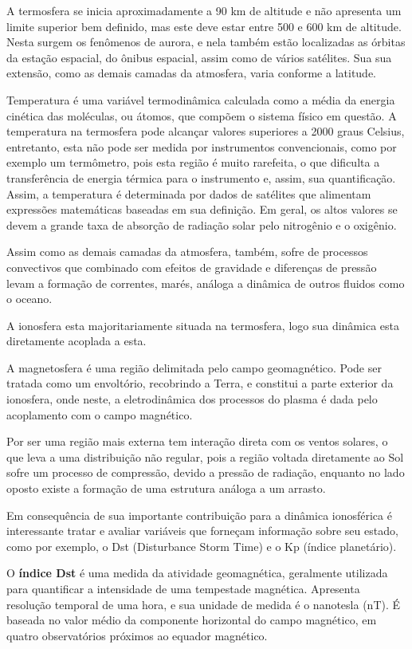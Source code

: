 A termosfera se inicia aproximadamente a 90 km de altitude e não apresenta um limite superior bem definido, mas este deve estar entre 500 e 600 km de altitude. Nesta surgem os fenômenos de aurora, e nela também estão localizadas as órbitas da estação espacial, do ônibus espacial, assim como de vários satélites. Sua sua extensão, como as demais camadas da atmosfera, varia conforme a latitude. 

Temperatura é uma variável termodinâmica calculada como a média da energia cinética das moléculas, ou átomos, que compõem o sistema físico em questão. A temperatura na termosfera pode alcançar valores superiores a 2000 graus Celsius, entretanto, esta não pode ser medida por instrumentos convencionais, como por exemplo um termômetro, pois esta região é muito rarefeita, o que dificulta a transferência de energia térmica para o instrumento e, assim, sua quantificação. Assim, a temperatura é determinada por dados de satélites que alimentam expressões matemáticas baseadas em sua definição. Em geral, os altos valores se devem a grande taxa de absorção de radiação solar pelo nitrogênio e o oxigênio.

Assim como as demais camadas da atmosfera, também, sofre de processos convectivos que combinado com efeitos de gravidade e diferenças de pressão levam a formação de correntes, marés, análoga a dinâmica de outros fluidos como o oceano.

A ionosfera esta majoritariamente situada na termosfera, logo sua dinâmica esta diretamente acoplada a esta.

A magnetosfera é uma região delimitada pelo campo geomagnético. Pode ser tratada como um envoltório, recobrindo a Terra, e constitui a parte exterior da ionosfera, onde neste, a eletrodinâmica dos processos do plasma é dada pelo acoplamento com o campo magnético.

Por ser uma região mais externa tem interação direta com os ventos solares, o que leva  a uma distribuição não regular, pois a região voltada diretamente ao Sol sofre um processo de compressão, devido a pressão de radiação, enquanto no lado oposto existe a formação de uma estrutura análoga a um arrasto.

Em consequência de sua importante contribuição para a dinâmica ionosférica é interessante tratar e avaliar variáveis que forneçam informação sobre seu estado, como por exemplo, o Dst (Disturbance Storm Time) e o Kp (índice planetário).

O {\bf índice Dst} é uma medida da atividade geomagnética, geralmente utilizada para quantificar a intensidade de uma tempestade magnética. Apresenta resolução temporal de uma hora, e sua unidade de medida é o nanotesla (nT). É baseada no valor médio da componente horizontal do campo magnético, em quatro observatórios próximos ao equador magnético.

